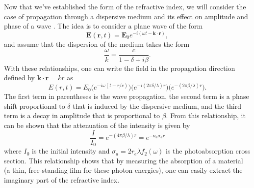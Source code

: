 Now that we've established the form of the refractive index, we will consider the case of propagation through a dispersive medium and its effect on amplitude and phase of a wave \cite{attwoodSoftXraysExtreme2000}. The idea is to consider a plane wave of the form
\begin{equation}
	\mathbf{E}(\mathbf{r},t)=\mathbf{E}_0e^{-i(\omega t - \mathbf{k}\cdot\mathbf{r})},
\end{equation}
and assume that the dispersion of the medium takes the form
\begin{equation}
	\frac{\omega}{k}=\frac{c}{1-\delta+i\beta}.
\end{equation}
With these relationships, one can write the field in the propagation direction defined by $\mathbf{k}\cdot\mathbf{r}=kr$ as
\begin{equation}
\label{eqn:wave_prop}
	E(r,t)=E_0 \big(e^{-i\omega(t - r/c)}\big) \big(e^{-i(2\pi\delta/\lambda)r}\big) \big(e^{-(2\pi\beta/\lambda)r}\big).
\end{equation}
The first term in parentheses is the wave propagation, the second term is a phase shift proportional to $\delta$ that is induced by the dispersive medium, and the third term is a decay in amplitude that is proportional to $\beta$.  From this relationship, it can be shown that the attenuation of the intensity is given by 
\begin{equation}
\label{eqn:beer-lambert}
	\frac{I}{I_0}=e^{-(4\pi\beta/\lambda)r}=e^{-n_a \sigma_a r}
\end{equation}
where $I_0$ is the initial intensity and $\sigma_a=2r_e \lambda f_2(\omega)$ is the photoabsorption cross section.  This relationship shows that by measuring the absorption of a material (a thin, free-standing film for these photon energies), one can easily extract the imaginary part of the refractive index.

